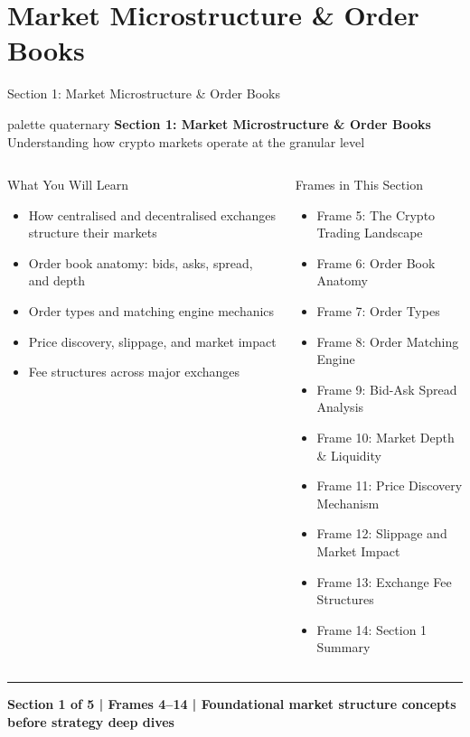 \documentclass[8pt,aspectratio=169]{beamer}
\newcommand{\bottomnote}[1]{\vfill\vspace{-2mm}\textcolor{mllavender2}{\rule{\textwidth}{0.4pt}}\vspace{1mm}\footnotesize\textbf{#1}}
\begin{document}
\section{Market Microstructure \& Order Books}

\begin{frame}{Section 1: Market Microstructure \& Order Books}
\begin{beamercolorbox}[sep=12pt,center,rounded=true,shadow=true]{palette quaternary}
  {\Large\bfseries Section 1: Market Microstructure \& Order Books}\\[4pt]
  {\normalsize Understanding how crypto markets operate at the granular level}
\end{beamercolorbox}

\vspace{4mm}
\begin{columns}[T]
\begin{block}{What You Will Learn}
\begin{itemize}\setlength{\itemsep}{2pt}
  \item How centralised and decentralised exchanges structure their markets
  \item Order book anatomy: bids, asks, spread, and depth
  \item Order types and matching engine mechanics
  \item Price discovery, slippage, and market impact
  \item Fee structures across major exchanges
\end{itemize}
\end{block}
\begin{block}{Frames in This Section}
\begin{itemize}\setlength{\itemsep}{2pt}
  \item Frame 5: The Crypto Trading Landscape
  \item Frame 6: Order Book Anatomy
  \item Frame 7: Order Types
  \item Frame 8: Order Matching Engine
  \item Frame 9: Bid-Ask Spread Analysis
  \item Frame 10: Market Depth \& Liquidity
  \item Frame 11: Price Discovery Mechanism
  \item Frame 12: Slippage and Market Impact
  \item Frame 13: Exchange Fee Structures
  \item Frame 14: Section 1 Summary
\end{itemize}
\end{block}
\end{columns}
\bottomnote{Section 1 of 5 | Frames 4--14 | Foundational market structure concepts before strategy deep dives}
\end{frame}
\end{document}
